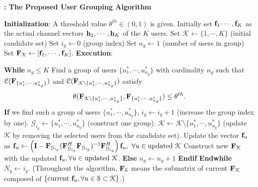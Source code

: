 \documentclass[11pt, draft, onecolumn ]{IEEEtran}
\begin{document}
\begin{algorithm}[!t]
   \caption{\textbf{: The Proposed User Grouping Algorithm}}\label{al:algoirhtm1}
    \begin{algorithmic}[1]
       \State \textbf{Initialization}:
       \State A threshold value $\theta^{th} \in (0,1)$ is given.
       \State Initially set ${\bf f}_1 \cdots, {\bf f}_K$ as the actual channel vectors ${\bf h}_1,\cdots,{\bf h}_K$ of the $K$ users.
       \State Set $\mathcal{K} \leftarrow \{1,\cdots,K\}$ (initial candidate set)
       \State Set $i_g \leftarrow 0$ (group index)
       \State Set $n_g \leftarrow 1$ (number of users in group)
       \State Set ${\bf F}_{\cal K} \leftarrow [{\bf f}_1, \cdots, {\bf f}_K]$.
             \vspace{1em}
       \State \textbf{Execution}:

       \State \textbf{While } $n_g \le K$
       \State \quad Find a group of users $\{u_1^*, \cdots, u_{n_g}^*\}$ with cardinality $n_g$ such that ${\cal C}({\bf F}_{\{u_1^*, \cdots, u_{n_g}^*\}})$ and ${\cal C}({\bf F}_{ \mathcal{K} \setminus \{u_1^*, \cdots, u_{n_g}^*\}})$ satisfy
                     \begin{equation}  \label{eq:Algor1theta}
                        \theta({\bf F}_{ \mathcal{K} \setminus \{u_1^*, \cdots, u_{n_g}^*\}},{\bf F}_{\{u_1^*, \cdots, u_{n_g}^*\}}) \leq \theta^{th}.
                    \end{equation}
       \State \quad \quad\textbf{If} we find such a group of users $\{u_1^*, \cdots, u_{n_g}^*\}$,
       \State \quad \quad\quad\quad $i_g\leftarrow i_g+1$ (increase the group index by one).
       \State \quad \quad\quad\quad $\mathcal{G}_{i_g} \leftarrow \{u_1^*, \cdots, u_{n_g}^*\}$ (construct one group).
         \State \quad \quad\quad\quad $\mathcal{K} \leftarrow \mathcal{K}\setminus \{u_1^*, \cdots, u_{n_g}^*\}$ (update ${\cal K}$ by removing the selected users from the candidate set).
       \State \quad  \quad\quad\quad Update the vector ${\bf f}_u$ as ${\bf f}_u \leftarrow \left({\bf I} - {\bf F}_{\mathcal{G}_{i_g}}({\bf F}_{\mathcal{G}_{i_g}}^H{\bf F}_{\mathcal{G}_{i_g}})^{-1}{\bf F}_{\mathcal{G}_{i_g}}^H\right){\bf f}_u, ~ \forall u \in \mbox{updated}~\mathcal{K}$
       \State \quad \quad\quad\quad Construct new ${\bf F}_{\mathcal{K}}$ with the updated ${\bf f}_u, \forall u \in \mbox{updated}~\mathcal{K}$.
       \State \quad \quad\textbf{Else}
       \State \quad  \quad\quad\quad $n_g \leftarrow n_g + 1$
       \State \quad \quad \textbf{Endif}
       \State \textbf{Endwhile}
       \State $N_g \leftarrow i_g$.
       \State (Throughout the algorithm, ${\bf F}_{\mathcal{S}}$ means the submatrix of current ${\bf F}_{\cal K}$ composed of $\{\mbox{current}~{\bf f}_u, \forall u \in \mathcal{S}\subset {\cal K}\}$.)
\end{algorithmic}
\end{algorithm}
\end{document}
